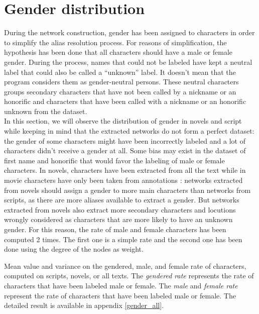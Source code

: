 \documentclass[a4paper, 12pt]{report}
\begin{document}
\section{Gender distribution}
During the network construction, gender has been assigned to characters in order to simplify the alias resolution process.
For reasons of simplification, the hypothesis has been done that all characters should have a male or female gender.
During the process, names that could not be labeled have kept a neutral label that could also be called a ``unknown'' label.
It doesn't mean that the program considers them as gender-neutral persons.
These neutral characters groups secondary characters that have not been called
by a nickname or an honorific and characters that have been called with a nickname or an honorific unknown from the dataset.\\

In this section, we will observe the distribution of gender in novels and script while keeping in mind that the extracted networks do not form a perfect dataset:
the gender of some characters might have been incorrectly labeled and a lot of characters didn't receive a gender at all.
Some bias may exist in the dataset of first name and honorific that would favor the labeling of male or female characters.
In novels, characters have been extracted from all the text while in movie characters have only been taken from annotations :
networks extracted from novels should assign a gender to more main characters than networks from scripts, as there are more aliases available to extract a gender.
But networks extracted from novels also extract more secondary characters and locutions wrongly considered as characters that are more likely to have an unknown gender.
For this reason, the rate of male and female characters has been computed 2 times.
The first one is a simple rate and the second one has been done using the degree of the nodes as weight.\\

\begin{table}[]
\caption{Mean value and variance on the gendered, male, and female rate of characters, computed on scripts, novels, or all texts. The \textit{gendered rate} represents the rate of characters that have been labeled male or female. The \textit{male} and \textit{female rate} represent the rate of characters that have been labeled male or female. The detailed result is available in appendix \ref{gender_all}.}
\label{gender_short}
\end{table}
\end{document}
